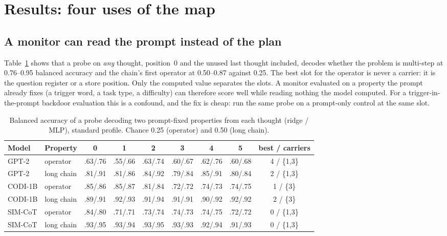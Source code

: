 \documentclass{article}
\begin{document}
\section{Results: four uses of the map}

\subsection{A monitor can read the prompt instead of the plan}\label{sec:leakage}

Table~\ref{tab:leakage} shows that a probe on \emph{any} thought, position~0 and the unused last thought included, decodes whether the problem is multi-step at 0.76--0.95 balanced accuracy and the chain's first operator at 0.50--0.87 against 0.25. The best slot for the operator is never a carrier: it is the question register or a store position. Only the computed value separates the slots. A monitor evaluated on a property the prompt already fixes (a trigger word, a task type, a difficulty) can therefore score well while reading nothing the model computed. For a trigger-in-the-prompt backdoor evaluation this is a confound, and the fix is cheap: run the same probe on a prompt-only control at the same slot.

\begin{table}[h]
\caption{Balanced accuracy of a probe decoding two prompt-fixed properties from each thought (ridge / MLP), standard profile. Chance 0.25 (operator) and 0.50 (long chain).}
\label{tab:leakage}
\centering
\scriptsize
\setlength{\tabcolsep}{3pt}
\begin{tabular}{llccccccc}
\toprule
Model & Property & 0 & 1 & 2 & 3 & 4 & 5 & best / carriers \\
\midrule
GPT-2 & operator & .63/.76 & .55/.66 & .63/.74 & .60/.67 & .62/.76 & .60/.68 & 4 / \{1,3\} \\
GPT-2 & long chain & .81/.91 & .81/.86 & .84/.92 & .79/.84 & .85/.91 & .80/.84 & 2 / \{1,3\} \\
CODI-1B & operator & .85/.86 & .85/.87 & .81/.84 & .72/.72 & .74/.73 & .74/.75 & 1 / \{3\} \\
CODI-1B & long chain & .89/.91 & .92/.93 & .91/.94 & .91/.91 & .90/.92 & .92/.92 & 2 / \{3\} \\
SIM-CoT & operator & .84/.80 & .71/.71 & .73/.74 & .74/.73 & .74/.75 & .72/.72 & 0 / \{1,3\} \\
SIM-CoT & long chain & .93/.95 & .93/.94 & .93/.95 & .93/.93 & .92/.94 & .91/.93 & 0 / \{1,3\} \\
\bottomrule
\end{tabular}
\end{table}
\end{document}
